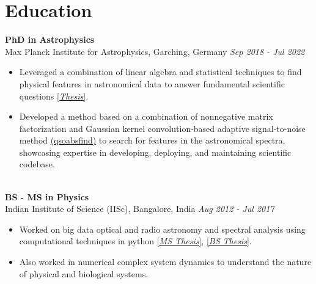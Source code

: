 \documentclass[a4paper,11pt]{article}
\begin{document}

\section*{Education}
\noindent
\textbf{PhD in Astrophysics} \\
Max Planck Institute for Astrophysics, Garching, Germany \hfill \textit{Sep 2018 - Jul 2022} \\
\begin{itemize}[noitemsep, topsep=0pt]
    \item Leveraged a combination of linear algebra and statistical techniques to find physical features in astronomical data to answer fundamental scientific questions \href{https://edoc.ub.uni-muenchen.de/30337/}{[\textit{Thesis}]}. 
    \item Developed a method based on a combination of nonnegative matrix factorization and Gaussian kernel convolution-based adaptive signal-to-noise method \href{https://github.com/abhi0395/qsoabsfind}{(qsoabsfind)} to search for features in the astronomical spectra, showcasing expertise in developing, deploying, and maintaining scientific codebase.
\end{itemize}

\noindent\\
\textbf{BS - MS in Physics} \\
Indian Institute of Science (IISc), Bangalore, India \hfill \textit{Aug 2012 - Jul 2017} \\
\begin{itemize}[noitemsep, topsep=0pt]
    \item Worked on big data optical and radio astronomy and spectral analysis using computational techniques in python \href{https://raw.githubusercontent.com/abhi0395/mycv/main/files/MS_thesis.pdf}{[\textit{MS Thesis}]}, \href{https://raw.githubusercontent.com/abhi0395/mycv/main/files/BS_thesis.pdf}{[\textit{BS Thesis}]}.
     \item Also worked in numerical complex system dynamics to understand the nature of physical and biological systems.
\end{itemize}
\end{document}

